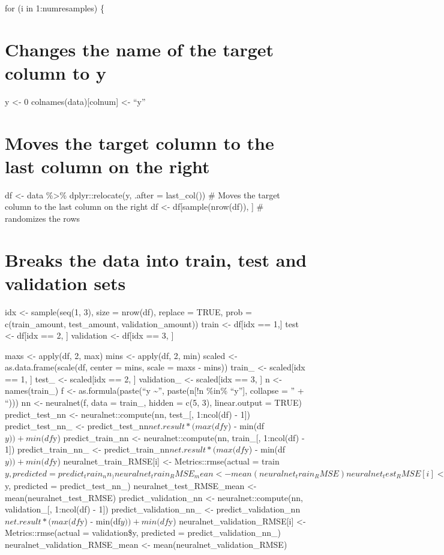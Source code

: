 \documentclass[
]{book}
\begin{document}
for (i in 1:numresamples) \{

\chapter{Changes the name of the target column to y}\label{changes-the-name-of-the-target-column-to-y-9}

y \textless- 0 colnames(data){[}colnum{]} \textless- ``y''

\chapter{Moves the target column to the last column on the right}\label{moves-the-target-column-to-the-last-column-on-the-right-9}

df \textless- data \%\textgreater\% dplyr::relocate(y, .after = last\_col()) \# Moves the
target column to the last column on the right df \textless-
df{[}sample(nrow(df)), {]} \# randomizes the rows

\chapter{Breaks the data into train, test and validation sets}\label{breaks-the-data-into-train-test-and-validation-sets-9}

idx \textless- sample(seq(1, 3), size = nrow(df), replace = TRUE, prob =
c(train\_amount, test\_amount, validation\_amount)) train \textless- df{[}idx == 1,{]} test \textless- df{[}idx == 2, {]} validation \textless- df{[}idx == 3, {]}

maxs \textless- apply(df, 2, max) mins \textless- apply(df, 2, min) scaled \textless-
as.data.frame(scale(df, center = mins, scale = maxs - mins)) train\_ \textless-
scaled{[}idx == 1, {]} test\_ \textless- scaled{[}idx == 2, {]} validation\_ \textless-
scaled{[}idx == 3, {]} n \textless- names(train\_) f \textless- as.formula(paste(``y \textasciitilde{}'',
paste(n{[}!n \%in\% ``y''{]}, collapse = '' + ``))) nn \textless- neuralnet(f, data =
train\_, hidden = c(5, 3), linear.output = TRUE) predict\_test\_nn \textless-
neuralnet::compute(nn, test\_{[}, 1:ncol(df) - 1{]}) predict\_test\_nn\_ \textless-
predict\_test\_nn\(net.result * (max(df\)y) - min(df\(y)) + min(df\)y)
predict\_train\_nn \textless- neuralnet::compute(nn, train\_{[}, 1:ncol(df) - 1{]})
predict\_train\_nn\_ \textless- predict\_train\_nn\(net.result * (max(df\)y) -
min(df\(y)) + min(df\)y) neuralnet\_train\_RMSE{[}i{]} \textless- Metrics::rmse(actual
= train\(y, predicted = predict_train_nn_)
neuralnet_train_RMSE_mean <- mean(neuralnet_train_RMSE)
neuralnet_test_RMSE[i] <- Metrics::rmse(actual = test\)y, predicted =
predict\_test\_nn\_) neuralnet\_test\_RMSE\_mean \textless-
mean(neuralnet\_test\_RMSE) predict\_validation\_nn \textless-
neuralnet::compute(nn, validation\_{[}, 1:ncol(df) - 1{]})
predict\_validation\_nn\_ \textless-
predict\_validation\_nn\(net.result * (max(df\)y) - min(df\(y)) + min(df\)y)
neuralnet\_validation\_RMSE{[}i{]} \textless- Metrics::rmse(actual = validation\$y,
predicted = predict\_validation\_nn\_) neuralnet\_validation\_RMSE\_mean \textless-
mean(neuralnet\_validation\_RMSE)
\end{document}
